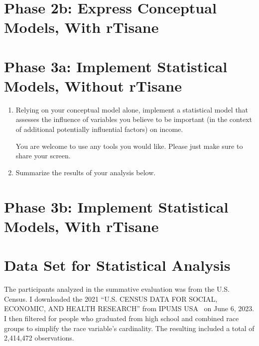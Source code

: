 \section{Phase 2b: Express Conceptual Models, With rTisane}
\clearpage

\section{Phase 3a: Implement Statistical Models, Without rTisane}
\begin{enumerate}
    \item Relying on your conceptual model alone, implement a statistical model that
    assesses the influence of variables you believe to be important (in the context
    of additional potentially influential factors) on income.

    You are welcome to use any tools you would like. Please just make sure to share
    your screen. 

    \item Summarize the results of your analysis below.
\end{enumerate}
\clearpage

\section{Phase 3b: Implement Statistical Models, With rTisane}
\clearpage

\section{Data Set for Statistical Analysis}
The \dataSet participants analyzed in the summative evaluation was from the U.S.
Census. I downloaded the 2021 ``U.S. CENSUS DATA FOR SOCIAL, ECONOMIC, AND
HEALTH RESEARCH'' from IPUMS USA~\cite{ruggles2020ipums} on June 6, 2023. I then filtered for
people who graduated from high school and combined race groups to
simplify the race variable's cardinality. The resulting \dataSet included a
total of 2,414,472 observations. 

